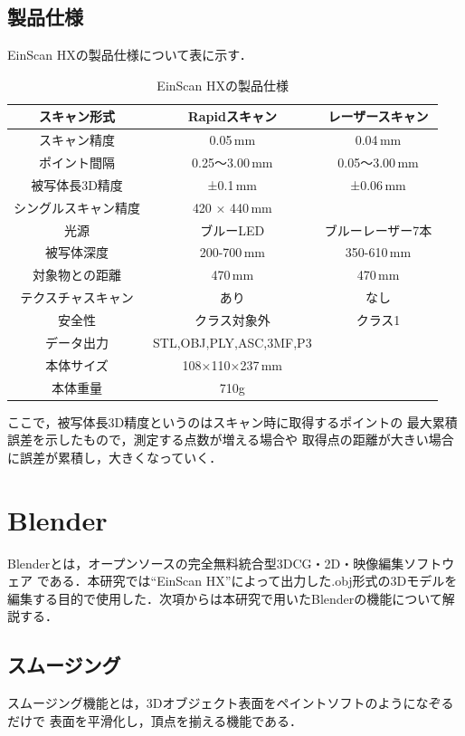 \documentclass{ltjsreport}
\begin{document}
		\subsection{製品仕様}
			EinScan HXの製品仕様について表に示す．
			\begin{table}[H]
			\begin{center}
			\caption{EinScan HXの製品仕様}
			\label{tab:EinScan}
			\begin{tabular}{c|cc} \toprule
				スキャン形式&Rapidスキャン&レーザースキャン\\ \hline
				スキャン精度&0.05\,mm&0.04\,mm\\
				ポイント間隔&0.25～3.00\,mm&0.05～3.00\,mm\\
				被写体長3D精度&±0.1\,mm&±0.06\,mm\\
				シングルスキャン精度&420 × 440\,mm&\\
				光源&ブルーLED&ブルーレーザー7本\\
				被写体深度&200-700\,mm&350-610\,mm\\
				対象物との距離&470\,mm&470\,mm\\
				テクスチャスキャン&あり&なし\\
				安全性&クラス対象外&クラス1\\
				データ出力&STL,OBJ,PLY,ASC,3MF,P3\\
				本体サイズ&108×110×237\,mm&\\
				本体重量&710g\\
				\bottomrule
			\end{tabular}
			\end{center}
			\end{table}
			ここで，被写体長3D精度というのはスキャン時に取得するポイントの
			最大累積誤差を示したもので，測定する点数が増える場合や
			取得点の距離が大きい場合に誤差が累積し，大きくなっていく．

	\section{Blender}
	
		Blenderとは，オープンソースの完全無料統合型3DCG・2D・映像編集ソフトウェア
		である．本研究では``EinScan HX''によって出力した.obj形式の3Dモデルを
		編集する目的で使用した．次項からは本研究で用いたBlenderの機能について解説する．
		\subsection{スムージング}
			スムージング機能とは，3Dオブジェクト表面をペイントソフトのようになぞるだけで
			表面を平滑化し，頂点を揃える機能である．
\end{document}
